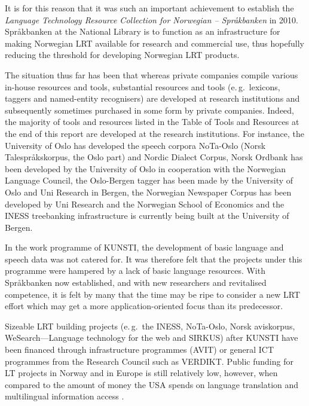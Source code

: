 \begin{multicols}{2}

It is for this reason that it was such an important achievement to establish the \textit{Language Technology Resource Collection for Norwegian -- Språkbanken} in 2010. %
Språkbanken at the National Library is to function as an infrastructure for making Norwegian LRT available for research and commercial use, thus hopefully reducing the threshold for developing Norwegian LRT products. 

The situation thus far has been that whereas private companies compile various in-house resources and tools,
substantial resources and tools (e.\,g.~lexicons, taggers and named-entity recognisers) are developed at research institutions and subsequently sometimes purchased in some form by private companies. 
Indeed, the majority of tools and resources listed in the Table of Tools and Resources at the end of this report are developed at the research institutions. 
For instance, the University of Oslo has developed the speech corpora NoTa-Oslo (Norsk Talespråkskorpus, the Oslo part) and Nordic Dialect Corpus, Norsk Ordbank has been developed by the University of Oslo in cooperation with the Norwegian Language Council, the Oslo-Bergen tagger has been made by the University of Oslo and Uni Research in Bergen, the Norwegian Newspaper Corpus has been developed by Uni Research and the Norwegian School of Economics and the INESS treebanking infrastructure is currently being built at the University of Bergen.

In the work programme of KUNSTI, the development of basic language and speech data was not catered for. 
It was therefore felt that the projects under this programme were hampered by a lack of basic language resources. 
With Språkbanken now established, and with new researchers and revitalised competence, it is felt by many that the time may be ripe to consider a new LRT effort which may get a more application-oriented focus than its predecessor. 

Sizeable LRT building projects (e.\,g.~the INESS, NoTa-Oslo, Norsk aviskorpus, WeSearch—Language technology for the web and SIRKUS) after KUNSTI have been financed through infrastructure programmes (AVIT) or general ICT programmes from the Research Council such as VERDIKT. 
Public funding for LT projects in Norway and in Europe is still relatively low, however, when compared to the amount of money the USA spends on language translation and multilingual information access \cite{laz1}.


\end{multicols}
